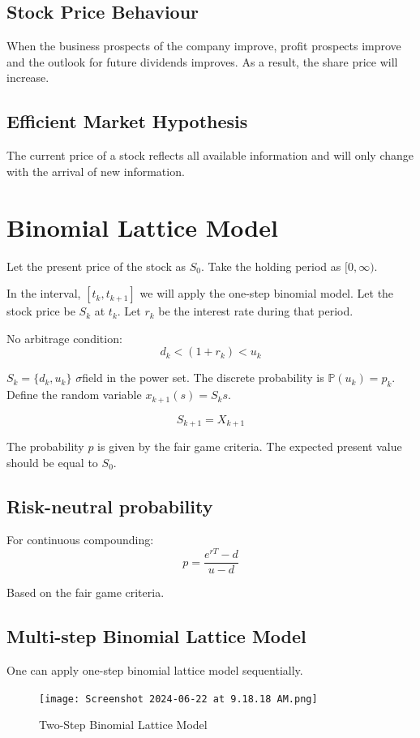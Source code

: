 \documentclass{report}
\begin{document}
\subsection{Stock Price Behaviour}
When the business prospects of the company improve, profit prospects improve and the outlook for future dividends improves. As a result, the share price will increase.


\subsection{Efficient Market Hypothesis}
The current price of a stock reflects all available information and will only change with the arrival of new information.

\section{Binomial Lattice Model}
Let the present price of the stock as $S_0$. Take the holding period as $[0, \infty)$.


In the interval, $[t_k, t_{k+1}]$ we will apply the one-step binomial model. Let the stock price be $S_k$ at $t_k$. Let $r_k$ be the interest rate during that period.


No arbitrage condition:
\[d_k < (1+r_k) < u_k\]


$S_k = \{d_k, u_k\}$ $\sigma $field in the power set. The discrete probability is $\mathbb{P}(u_k)= p_k$. Define the random variable $x_{k+1}(s) = S_ks$.


\[S_{k+1} = X_{k+1}\]


The probability $p$ is given by the fair game criteria. The expected present value should be equal to $S_0$.


\subsection{Risk-neutral probability}
For continuous compounding:
\begin{equation}
    p = \frac{e^{rT}-d}{u-d}
\end{equation}

Based on the fair game criteria.


\subsection{Multi-step Binomial Lattice Model}
One can apply one-step binomial lattice model sequentially.
\begin{figure}[h!]
     \centering
     \texttt{[image: Screenshot 2024-06-22 at 9.18.18 AM.png]}
     \caption{Two-Step Binomial Lattice Model}
     \label{fig:tblm}
\end{figure}
\end{document}
